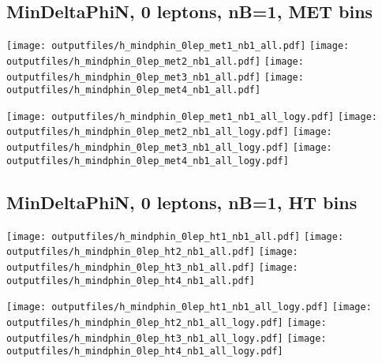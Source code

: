 \documentclass[11pt]{article}
\begin{document}
    \clearpage


    \subsection{ MinDeltaPhiN, 0 leptons, nB=1, MET bins }

    \noindent
     \texttt{[image: outputfiles/h\_mindphin\_0lep\_met1\_nb1\_all.pdf]}
     \texttt{[image: outputfiles/h\_mindphin\_0lep\_met2\_nb1\_all.pdf]}
     \texttt{[image: outputfiles/h\_mindphin\_0lep\_met3\_nb1\_all.pdf]}
     \texttt{[image: outputfiles/h\_mindphin\_0lep\_met4\_nb1\_all.pdf]}

    \noindent
     \texttt{[image: outputfiles/h\_mindphin\_0lep\_met1\_nb1\_all\_logy.pdf]}
     \texttt{[image: outputfiles/h\_mindphin\_0lep\_met2\_nb1\_all\_logy.pdf]}
     \texttt{[image: outputfiles/h\_mindphin\_0lep\_met3\_nb1\_all\_logy.pdf]}
     \texttt{[image: outputfiles/h\_mindphin\_0lep\_met4\_nb1\_all\_logy.pdf]}

    \clearpage



    \subsection{ MinDeltaPhiN, 0 leptons, nB=1, HT bins }

    \noindent
     \texttt{[image: outputfiles/h\_mindphin\_0lep\_ht1\_nb1\_all.pdf]}
     \texttt{[image: outputfiles/h\_mindphin\_0lep\_ht2\_nb1\_all.pdf]}
     \texttt{[image: outputfiles/h\_mindphin\_0lep\_ht3\_nb1\_all.pdf]}
     \texttt{[image: outputfiles/h\_mindphin\_0lep\_ht4\_nb1\_all.pdf]}

    \noindent
     \texttt{[image: outputfiles/h\_mindphin\_0lep\_ht1\_nb1\_all\_logy.pdf]}
     \texttt{[image: outputfiles/h\_mindphin\_0lep\_ht2\_nb1\_all\_logy.pdf]}
     \texttt{[image: outputfiles/h\_mindphin\_0lep\_ht3\_nb1\_all\_logy.pdf]}
     \texttt{[image: outputfiles/h\_mindphin\_0lep\_ht4\_nb1\_all\_logy.pdf]}

    \clearpage



\end{document}
